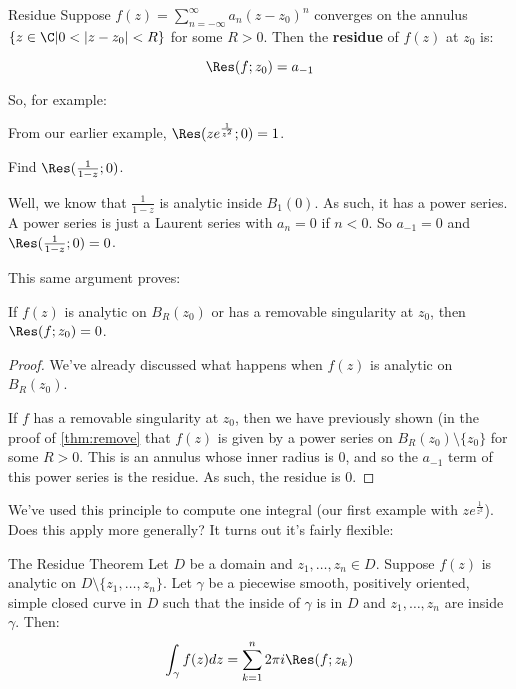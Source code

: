 \begin{defbo}{Residue}{} Suppose $f(z) = \sum_{n = -\infty}^\infty a_n(z-z_0)^n$ converges on the annulus $\{z\in \C|0 < |z-z_0| < R\}$ for some $R > 0$. Then the {\bf residue} of $f(z)$ at $z_0$ is:

$$\Res(f;z_0) = a_{-1}$$
\end{defbo}

So, for example:

\begin{ex}{}{} From our earlier example, $\Res(ze^{\frac{1}{z^2}};0) = 1$.
\end{ex}

\begin{ex}{}{}Find $\Res(\frac{1}{1-z};0)$.

Well, we know that $\frac{1}{1-z}$ is analytic inside $B_1(0)$. As such, it has a power series. A power series is just a Laurent series with $a_n = 0$ if $n < 0$. So $a_{-1} = 0$ and $\Res(\frac{1}{1-z};0) = 0$.
\end{ex}

This same argument proves:

\begin{thmbo}{}{} If $f(z)$ is analytic on $B_R(z_0)$ or has a removable singularity at $z_0$, then $\Res(f;z_0) = 0$.
\end{thmbo}

\begin{proof} We've already discussed what happens when $f(z)$ is analytic on $B_R(z_0)$.

If $f$ has a removable singularity at $z_0$, then we have previously shown (in the proof of \ref{thm:remove} that $f(z)$ is given by a power series on $B_R(z_0)\setminus\{z_0\}$ for some $R> 0$. This is an annulus whose inner radius is $0$, and so the $a_{-1}$ term of this power series is the residue. As such, the residue is $0$.
\end{proof}

We've used this principle to compute one integral (our first example with $ze^{\frac{1}{z^2}}$). Does this apply more generally? It turns out it's fairly flexible:

\begin{thmbo}{The Residue Theorem}{} Let $D$ be a domain and $z_1,\dots,z_n\in D$. Suppose $f(z)$ is analytic on $D\setminus \{z_1,\dots,z_n\}$. Let $\gamma$ be a piecewise smooth, positively oriented, simple closed curve in $D$ such that the inside of $\gamma$ is in $D$ and $z_1,\dots,z_n$ are inside $\gamma$. Then:
$$\int_{\gamma} f(z)dz = \sum_{k = 1}^n 2\pi i \Res(f;z_k)$$

\end{thmbo}

